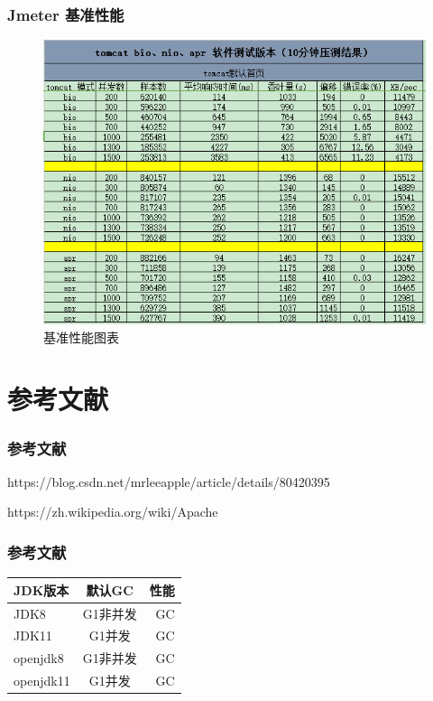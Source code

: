 \documentclass{beamer}
\begin{document}
\begin{frame}
\frametitle{Jmeter 基准性能}
\begin{figure}[ht]
	
	\centering
	\includegraphics[scale=0.45]{img/benchmark.png}
	\caption{基准性能图表}
	\label{fig:pathdemo1}
\end{figure}

\end{frame}


\section{参考文献}

\begin{frame}[allowframebreaks]
    \frametitle{参考文献}
    \small
    
    
    https://blog.csdn.net/mrleeapple/article/details/80420395
    
    https://zh.wikipedia.org/wiki/Apache%
\end{frame}

\begin{frame}[allowframebreaks]
\frametitle{参考文献}
\centering
\begin{tabular}{|l|c|r|}
	\hline 
	\large	JDK版本 &  \large 默认GC&  \large 性能 \\
	\hline 
	JDK8 & G1非并发 &  GC \\
	\hline 
	JDK11 & G1并发 & GC \\
	\hline 
	openjdk8 & G1非并发& GC  \\
	\hline 
	openjdk11& G1并发 & GC \\
	\hline
\end{tabular}
\end{frame}
\end{document}
